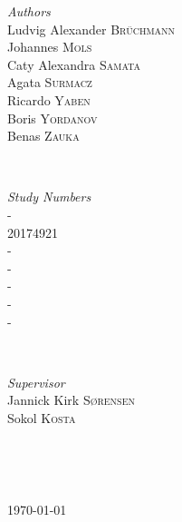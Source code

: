 \documentclass[12p]{article}
\begin{document}
\begin{titlepage}
		\begin{minipage}{0.4\textwidth}
			\begin{flushleft} \large
				\emph{Authors}\\
				Ludvig Alexander \textsc{Brüchmann} \\
				Johannes \textsc{Mols} \\
				Caty Alexandra \textsc{Samata} \\
				Agata \textsc{Surmacz} \\
				Ricardo \textsc{Yaben} \\
				Boris \textsc{Yordanov} \\
				Benas \textsc{Zauka} \\
			\end{flushleft}
		\end{minipage}
		~
		\begin{minipage}{0.4\textwidth}
			\begin{flushright} \large
				\emph{Study Numbers} \\
				- \\
				20174921 \\
				- \\
				- \\
				- \\
				- \\
				- \\
			\end{flushright}
		\end{minipage}\\[0.5cm]
		 
		 
		\begin{minipage}{0.4\textwidth}
			\begin{flushleft} \large
				\emph{Supervisor}\\
				Jannick Kirk \textsc{Sørensen} \\
				Sokol \textsc{Kosta} \\
			\end{flushleft}
		\end{minipage}
		~
		\begin{minipage}{0.4\textwidth}
			\begin{flushright} \large
			\end{flushright}
		\end{minipage}\\[0.5cm]
		
			
		\vfill\vfill\vfill %
			
		{\large\today} %
			
		\end{titlepage}
		
\end{document}
